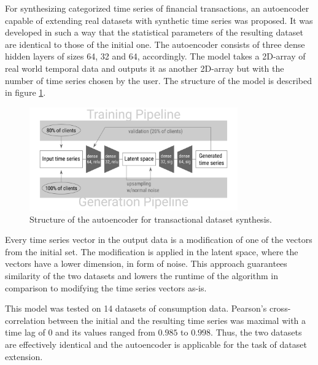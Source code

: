 \documentclass[13pt, a4paper]{article}
\begin{document}
For synthesizing categorized time series of financial transactions, an autoencoder capable of extending real datasets with synthetic time series was proposed. It was developed in such a way that the statistical parameters of the resulting dataset are identical to those of the initial one. The autoencoder consists of three dense hidden layers of sizes 64, 32 and 64, accordingly. The model takes a 2D-array of real world temporal data and outputs it as another 2D-array but with the number of time series chosen by the user. The structure of the model is described in figure \ref{fig:gr7}.
\begin{figure}[h!]\vspace*{4pt}
	\centerline{\includegraphics[width=0.8\textwidth]{./visuals/gr7.png}}
\caption{Structure of the autoencoder for transactional dataset synthesis.}
\label{fig:gr7}
\end{figure}

Every time series vector in the output data is a modification of one of the vectors from the initial set. The modification is applied in the latent space, where the vectors have a lower dimension, in form of noise. This approach guarantees similarity of the two datasets and lowers the runtime of the algorithm in comparison to modifying the time series vectors as-is.

This model was tested on 14 datasets of consumption data. Pearson's cross-correlation between the initial and the resulting time series was maximal with a time lag of 0 and its values ranged from $0.985$ to $0.998$. Thus, the two datasets are effectively identical and the autoencoder is applicable for the task of dataset extension.
\end{document}
